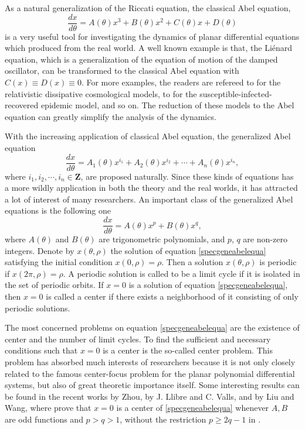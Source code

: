\documentclass[11pt]{amsart}
\theoremstyle{remark}
\theoremstyle{definition}
\begin{document}
As a natural generalization of the Riccati equation,  the classical Abel  equation,
 \begin{equation*}
\frac{dx}{d\theta}=A(\theta)x^3+B(\theta)x^2+C(\theta)x+D(\theta)
\end{equation*}
is   a  very  useful tool for investigating the dynamics of  planar differential equations which produced from the real world.  A well known  example is that,  the Li\'{e}nard equation,
 which is a generalization of the equation
of motion of the damped oscillator,  can be transformed to the classical Abel  equation  with $C(x)\equiv D(x)\equiv 0$.
For more examples, the readers are refereed to \cite{HM2003}  for  the relativistic dissipative cosmological models, to \cite{TLM2014} for the susceptible-infected-recovered epidemic model, and so on.  The reduction of these models      to  the Abel  equation
     can greatly simplify the analysis of the dynamics.


With the increasing application of classical  Abel  equation,  the generalized Abel    equation
 \begin{equation*}
\frac{dx}{d\theta}=A_1(\theta)x^{i_1}+A_2(\theta)x^{i_2}+\cdots+A_n(\theta)x^{i_n},
\end{equation*}
where $i_1, i_2, \cdots, i_n\in \mathbf{Z}$, are   proposed  naturally. Since these kinds of equations   has a more wildly application in both the theory and the real worlds,  it has attracted  a lot of   interest of many researchers.
 An important class of the  generalized Abel  equations is the following one
\begin{equation}\label{specgeneabelequa}
\frac{dx}{d\theta}=A(\theta)x^p+B(\theta)x^q,
\end{equation}
where $A(\theta)$  and $B(\theta)$ are trigonometric polynomials, and $p$, $q$ are non-zero integers. Denote by $x(\theta,\rho)$ the solution of equation \eqref{specgeneabelequa} satisfying the initial condition  $x(0,\rho)=\rho$.
Then a solution $x(\theta,\rho)$ is periodic if $x(2\pi,\rho)=\rho$. A periodic solution is called to be a limit cycle if it is isolated in the set of periodic orbits. If $x=0$ is a solution of equation \eqref{specgeneabelequa}, then
 $x=0$ is called a center if there exists a neighborhood of it consisting of only periodic solutions.




The most concerned problems on   equation \eqref{specgeneabelequa}
 are the existence of center and the number of  limit cycles.
To find  the  sufficient
and necessary conditions such that  $x=0$  is a center is    the so-called center problem. This problem has absorbed  much interests of researchers because it is  not only
closely related to the famous center-focus problem for the planar polynomial differential
systems, but also  of great theoretic importance itself. Some interesting results  can be found in the recent works  \cite{Zhou2020} by Zhou,  \cite{LV2020} by  J. Llibre and C. Valls, and \cite{LWang2023} by Liu and Wang,
where \cite{LWang2023} prove  that   $x=0$  is a center of \eqref{specgeneabelequa} whenever   $A, B$ are odd functions and $p>q>1$, without the restriction $p\geq 2q-1$  in  \cite{LV2020}.
\end{document}
